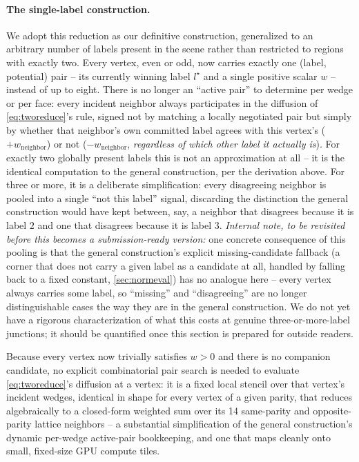 \documentclass[journal]{vgtc}                     %
\begin{document}
\paragraph{The single-label construction.} We adopt this reduction as our definitive construction, generalized to an arbitrary number of labels present in the scene rather than restricted to regions with exactly two. Every vertex, even or odd, now carries exactly one (label, potential) pair -- its currently winning label $l^\star$ and a single positive scalar $w$ -- instead of up to eight. There is no longer an ``active pair'' to determine per wedge or per face: every incident neighbor always participates in the diffusion of \cref{eq:tworeduce}'s rule, signed not by matching a locally negotiated pair but simply by whether that neighbor's own committed label agrees with this vertex's ($+w_{\mathrm{neighbor}}$) or not ($-w_{\mathrm{neighbor}}$, \emph{regardless of which other label it actually is}). For exactly two globally present labels this is not an approximation at all -- it is the identical computation to the general construction, per the derivation above. For three or more, it is a deliberate simplification: every disagreeing neighbor is pooled into a single ``not this label'' signal, discarding the distinction the general construction would have kept between, say, a neighbor that disagrees because it is label $2$ and one that disagrees because it is label $3$. \emph{Internal note, to be revisited before this becomes a submission-ready version:} one concrete consequence of this pooling is that the general construction's explicit missing-candidate fallback (a corner that does not carry a given label as a candidate at all, handled by falling back to a fixed constant, \cref{sec:normeval}) has no analogue here -- every vertex always carries some label, so ``missing'' and ``disagreeing'' are no longer distinguishable cases the way they are in the general construction. We do not yet have a rigorous characterization of what this costs at genuine three-or-more-label junctions; it should be quantified once this section is prepared for outside readers.

Because every vertex now trivially satisfies $w>0$ and there is no companion candidate, no explicit combinatorial pair search is needed to evaluate \cref{eq:tworeduce}'s diffusion at a vertex: it is a fixed local stencil over that vertex's incident wedges, identical in shape for every vertex of a given parity, that reduces algebraically to a closed-form weighted sum over its 14 same-parity and opposite-parity lattice neighbors -- a substantial simplification of the general construction's dynamic per-wedge active-pair bookkeeping, and one that maps cleanly onto small, fixed-size GPU compute tiles.
\end{document}
